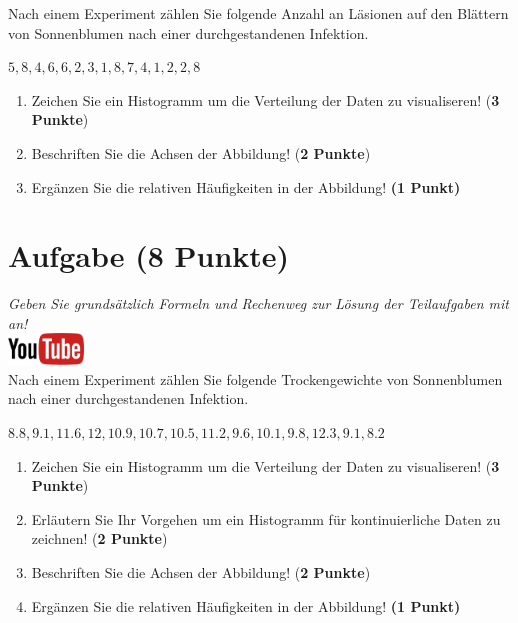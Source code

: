 \documentclass[a4paper, 10pt]{scrartcl}\usepackage[]{graphicx}\usepackage[]{xcolor}
\begin{document}
Nach einem Experiment z{\"a}hlen Sie folgende Anzahl an L{\"a}sionen auf den
Bl{\"a}ttern von Sonnenblumen nach einer durchgestandenen Infektion. 

\begin{center}
$5, 8, 4, 6, 6, 2, 3, 1, 8, 7, 4, 1, 2, 2, 8$
\end{center}

\begin{enumerate}
\item Zeichen Sie ein Histogramm um die Verteilung der Daten zu visualiseren! (\textbf{3 Punkte})
\item Beschriften Sie die Achsen der Abbildung! (\textbf{2 Punkte})
\item Erg{\"a}nzen Sie die relativen H{\"a}ufigkeiten in der Abbildung! \textbf{(1
    Punkt)}  
\end{enumerate}

 
\clearpage

\section{Aufgabe \hfill (8 Punkte)}

\textit{Geben Sie grunds{\"a}tzlich Formeln und Rechenweg zur L{\"o}sung der
  Teilaufgaben mit an!} \\[1Ex]

\hfill\href{https://youtu.be/ORHSPTCdfeY}{\includegraphics[width =
  2cm]{img/youtube}}\\[1Ex]



Nach einem Experiment z{\"a}hlen Sie folgende Trockengewichte von Sonnenblumen nach einer durchgestandenen Infektion. 

\begin{center}
$8.8, 9.1, 11.6, 12, 10.9, 10.7, 10.5, 11.2, 9.6, 10.1, 9.8, 12.3, 9.1, 8.2$
\end{center}

\begin{enumerate}
\item Zeichen Sie ein Histogramm um die Verteilung der Daten zu
  visualiseren! (\textbf{3 Punkte})
 \item Erl{\"a}utern Sie Ihr Vorgehen um ein Histogramm f{\"u}r kontinuierliche
  Daten zu zeichnen!  (\textbf{2 Punkte})
\item Beschriften Sie die Achsen der Abbildung! (\textbf{2 Punkte})
\item Erg{\"a}nzen Sie die relativen H{\"a}ufigkeiten in der Abbildung! \textbf{(1
    Punkt)}  
\end{enumerate}
\end{document}
